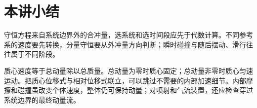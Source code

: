 \section{本讲小结}
守恒方程来自系统边界外的合冲量，选系统和选时间段应先于代数计算。不同参考系的速度要先转换，分量守恒要从外冲量方向判断；瞬时碰撞与随后摆动、滑行往往属于不同阶段。

质心速度等于总动量除以总质量。总动量为零时质心固定；总动量非零时质心匀速运动。把质心位移式与相对位移式联立，可以跳过不需要的内部加速细节。内部摩擦和碰撞虽改变个体速度，整体仍可保持动量；对喷射和气流装置，还应检查穿过系统边界的最终动量流。
